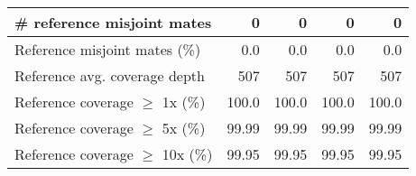 \documentclass[12pt,a4paper]{article}
\begin{document}
\begin{table}[ht]
\begin{center}
\begin{tabular}{|l*{4}{|r}|}
\# reference misjoint mates & 0 & 0 & 0 & 0 \\ \hline
Reference misjoint mates (\%) & 0.0 & 0.0 & 0.0 & 0.0 \\ \hline
Reference avg. coverage depth & 507 & 507 & 507 & 507 \\ \hline
Reference coverage $\geq$ 1x (\%) & 100.0 & 100.0 & 100.0 & 100.0 \\ \hline
Reference coverage $\geq$ 5x (\%) & 99.99 & 99.99 & 99.99 & 99.99 \\ \hline
Reference coverage $\geq$ 10x (\%) & 99.95 & 99.95 & 99.95 & 99.95 \\ \hline
\end{tabular}
\end{center}
\end{table}
\end{document}
